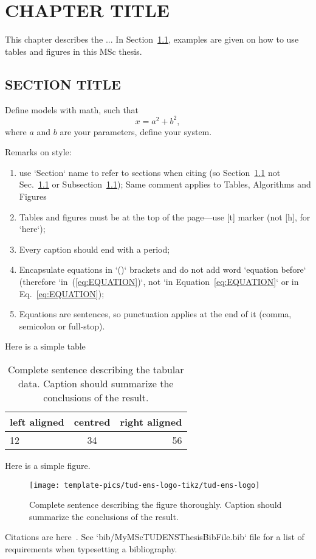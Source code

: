 \chapter{CHAPTER TITLE}
\label{chp:chapter_1}

This chapter describes the ... In Section~\ref{sec:SECTIONTITLE}, examples are given on how to use tables and figures in this MSc thesis.

\section{SECTION TITLE}
\label{sec:SECTIONTITLE}


Define models with math, such that
%
\begin{equation}
x = a^2 + b^2,
\label{eq:EQUATION}
\end{equation}
%
where $a$ and $b$ are your parameters, define your system.

Remarks on style:

\begin{enumerate}
	\item use `Section` name to refer to sections when citing (so Section~\ref{sec:SECTIONTITLE} not Sec.~\ref{sec:SECTIONTITLE} or Subsection~\ref{sec:SECTIONTITLE}); Same comment applies to Tables, Algorithms and Figures
	\item Tables and figures must be at the top of the page---use [t] marker (not [h], for `here`); 
	\item Every caption should end with a period;
	\item Encapsulate equations in `()` brackets and do not add word `equation before` (therefore `in~(\ref{eq:EQUATION})`, not `in Equation~\ref{eq:EQUATION}` or in Eq.~\ref{eq:EQUATION});
	\item Equations are sentences, so punctuation applies at the end of it (comma, semicolon or full-stop).
\end{enumerate}

Here is a simple table

\begin{table}[t]
\centering
\begin{tabular}{| l | c | r |}
\hline
left aligned & centred & right aligned \\
\hline \hline
12 & 34 & 56 \\
\hline
\end{tabular}
\caption{Complete sentence describing the tabular data. Caption should summarize the conclusions of the result.}
\label{tab:table_1}
\end{table}

Here is a simple figure.

\begin{figure}[t]
\texttt{[image: template-pics/tud-ens-logo-tikz/tud-ens-logo]}
\caption{Complete sentence describing the figure thoroughly. Caption should summarize the conclusions of the result.}
\label{fig:example-figure}
\end{figure}

Citations are here~\cite{polastre2004analysis,powercast_website,hester2016persistent,schaper_msc_thesis_2017,dementyev_uist_2016}. See `bib/MyMScTUDENSThesisBibFile.bib` file for a list of requirements when typesetting a bibliography.
